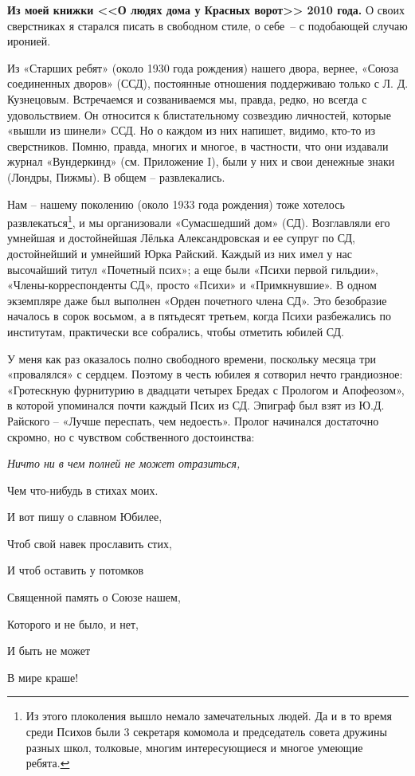 \textbf{Из моей книжки <<О людях дома у Красных ворот>> 2010 года.} О своих сверстниках я старался писать в свободном стиле, о себе~-- с подобающей случаю иронией.

﻿Из «Старших ребят» (около 1930 года рождения) нашего двора, вернее, «Союза соединенных дворов» (ССД), постоянные отношения поддерживаю только с Л. Д. Кузнецовым. Встречаемся и созваниваемся мы, правда, редко, но всегда с удовольствием. Он относится к блистательному созвездию личностей, которые «вышли из шинели» ССД. Но о каждом из них напишет, видимо, кто-то из сверстников. Помню, правда, многих и многое, в частности,  что они издавали журнал  «Вундеркинд» (см. Приложение I), были у них и свои денежные знаки (Лондры, Пижмы). В общем – развлекались.

Нам – нашему поколению (около 1933 года рождения) тоже хотелось развлекаться\footnote{Из этого плоколения вышло немало замечательных людей. Да и в то время среди Психов были 3 секретаря комомола и председатель совета дружины разных школ, толковые, многим интересующиеся и многое умеющие ребята.}, и мы организовали «Сумасшедший дом» (СД). Возглавляли его умнейшая и достойнейшая Лёлька Александровская и ее супруг по СД, достойнейший и умнейший Юрка Райский. Каждый из них имел у нас высочайший титул «Почетный псих»; а еще были «Психи первой гильдии», «Члены-корреспонденты СД», просто «Психи» и «Примкнувшие». В одном экземпляре даже был выполнен «Орден почетного члена СД». Это безобразие началось в сорок восьмом, а в пятьдесят     третьем,    когда     Психи     разбежались      по институтам, практически все собрались, чтобы отметить юбилей СД.

У меня как раз оказалось полно свободного времени, поскольку месяца три «провалялся» с сердцем. Поэтому в честь юбилея я сотворил нечто грандиозное: «Гротескную фурнитурию в двадцати четырех Бредах с Прологом и Апофеозом», в которой упоминался почти каждый Псих из СД. Эпиграф был взят из Ю.Д. Райского –   «Лучше переспать, чем недоесть». Пролог начинался достаточно скромно, но с чувством собственного достоинства: 

\newpage
{}






\restoregeometry

{\itshape
    Ничто ни в чем полней не может отразиться,
    
	Чем что-нибудь в стихах моих.
	
	И вот пишу о славном Юбилее,
	
	Чтоб свой навек прославить стих,
	
	И чтоб оставить у потомков
	
	Священной память о Союзе нашем,
	
	Которого и не было, и нет,
	
	И быть не может
	
	В мире краше!
}

